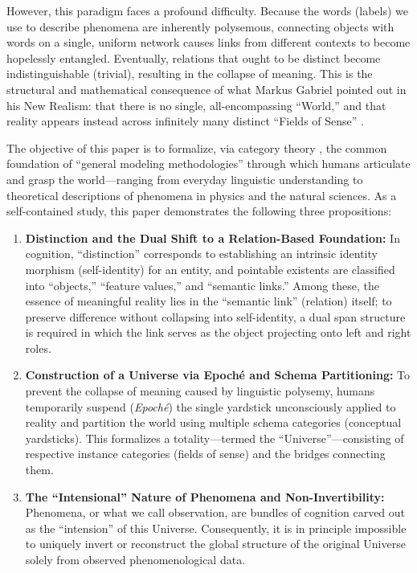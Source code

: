 \documentclass[11pt,a4paper]{article}
\theoremstyle{definition}
\theoremstyle{plain}
\begin{document}
However, this paradigm faces a profound difficulty. Because the words (labels) we use to describe phenomena are inherently polysemous, connecting objects with words on a single, uniform network causes links from different contexts to become hopelessly entangled. Eventually, relations that ought to be distinct become indistinguishable (trivial), resulting in the collapse of meaning. This is the structural and mathematical consequence of what Markus Gabriel pointed out in his New Realism: that there is no single, all-encompassing ``World,'' and that reality appears instead across infinitely many distinct ``Fields of Sense'' \cite{gabriel2013,gabriel2015}.

The objective of this paper is to formalize, via category theory \cite{maclane1998}, the common foundation of ``general modeling methodologies'' through which humans articulate and grasp the world---ranging from everyday linguistic understanding to theoretical descriptions of phenomena in physics and the natural sciences. As a self-contained study, this paper demonstrates the following three propositions:

\begin{enumerate}
    \item \textbf{Distinction and the Dual Shift to a Relation-Based Foundation:} In cognition, ``distinction'' corresponds to establishing an intrinsic identity morphism (self-identity) for an entity, and pointable existents are classified into ``objects,'' ``feature values,'' and ``semantic links.'' Among these, the essence of meaningful reality lies in the ``semantic link'' (relation) itself; to preserve difference without collapsing into self-identity, a dual span structure is required in which the link serves as the object projecting onto left and right roles.
    \item \textbf{Construction of a Universe via Epoch\'e and Schema Partitioning:} To prevent the collapse of meaning caused by linguistic polysemy, humans temporarily suspend (\textit{Epoch\'e}) the single yardstick unconsciously applied to reality and partition the world using multiple schema categories (conceptual yardsticks). This formalizes a totality---termed the ``Universe''---consisting of respective instance categories (fields of sense) and the bridges connecting them.
    \item \textbf{The ``Intensional'' Nature of Phenomena and Non-Invertibility:} Phenomena, or what we call observation, are bundles of cognition carved out as the ``intension'' of this Universe. Consequently, it is in principle impossible to uniquely invert or reconstruct the global structure of the original Universe solely from observed phenomenological data.
\end{enumerate}
\end{document}
